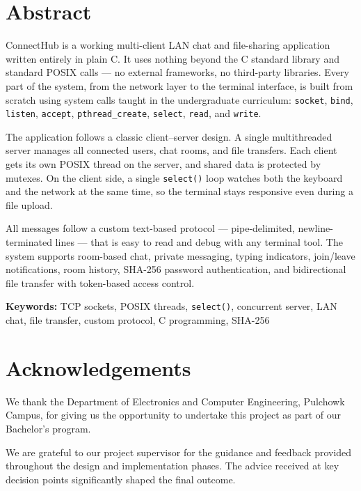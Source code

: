 \documentclass[12pt,a4paper]{report}
\begin{document}
\chapter*{Abstract}
ConnectHub is a working multi-client LAN chat and file-sharing application written entirely in plain C. It uses nothing beyond the C standard library and standard POSIX calls — no external frameworks, no third-party libraries. Every part of the system, from the network layer to the terminal interface, is built from scratch using system calls taught in the undergraduate curriculum: \texttt{socket}, \texttt{bind}, \texttt{listen}, \texttt{accept}, \texttt{pthread\_create}, \texttt{select}, \texttt{read}, and \texttt{write}.

The application follows a classic client–server design. A single multithreaded server manages all connected users, chat rooms, and file transfers. Each client gets its own POSIX thread on the server, and shared data is protected by mutexes. On the client side, a single \texttt{select()} loop watches both the keyboard and the network at the same time, so the terminal stays responsive even during a file upload.

All messages follow a custom text-based protocol — pipe-delimited, newline-terminated lines — that is easy to read and debug with any terminal tool. The system supports room-based chat, private messaging, typing indicators, join/leave notifications, room history, SHA-256 password authentication, and bidirectional file transfer with token-based access control.

\textbf{Keywords:} TCP sockets, POSIX threads, \texttt{select()}, concurrent server, LAN chat, file transfer, custom protocol, C programming, SHA-256

\clearpage

\chapter*{Acknowledgements}
We thank the Department of Electronics and Computer Engineering, Pulchowk Campus, for giving us the opportunity to undertake this project as part of our Bachelor's program.

We are grateful to our project supervisor for the guidance and feedback provided throughout the design and implementation phases. The advice received at key decision points significantly shaped the final outcome.
\end{document}
